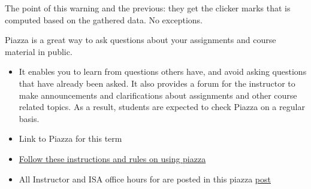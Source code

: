 \begin{frame}[fragile]
\begin{itemize}
		The point of this warning and the previous: they get the clicker marks 
		that is computed based on the gathered data.  No exceptions.
\end{itemize}

\fi\ENotes
\end{frame}

\begin{frame}[fragile]
Piazza is a great way to ask questions about your assignments and course material in public.
\begin{itemize}
    \item It enables you to learn from questions others have, and avoid asking questions that have already been asked. It also provides a forum for the instructor to make announcements and clarifications about assignments and other course related topics. As a result, students are expected to check Piazza on a regular basis.

\item Link to Piazza for this term \piazza
\item \href{https://piazza.com/class/m06v54bgxhy2t3/post/6}{Follow these instructions and rules on using piazza}
\item All Instructor and ISA office hours for are posted in this piazza \href{https://piazza.com/class/m06v54bgxhy2t3/post/7}{post}
\end{itemize}
\end{frame}



